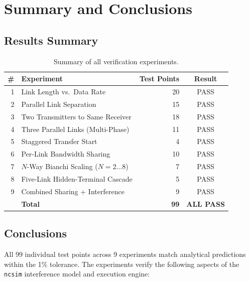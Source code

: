 \documentclass[11pt,a4paper]{article}
\newcommand{\ncsim}{\texttt{ncsim}}
\begin{document}
\section{Summary and Conclusions}
\label{sec:conclusions}

\subsection{Results Summary}

\begin{table}[h]
\centering
\caption{Summary of all verification experiments.}
\label{tab:summary}
\begin{tabular}{rlrc}
\toprule
\# & Experiment & Test Points & Result \\
\midrule
1 & Link Length vs.\ Data Rate & 20 & PASS \\
2 & Parallel Link Separation & 15 & PASS \\
3 & Two Transmitters to Same Receiver & 18 & PASS \\
4 & Three Parallel Links (Multi-Phase) & 11 & PASS \\
5 & Staggered Transfer Start & 4 & PASS \\
6 & Per-Link Bandwidth Sharing & 10 & PASS \\
7 & $N$-Way Bianchi Scaling ($N=2\ldots 8$) & 7 & PASS \\
8 & Five-Link Hidden-Terminal Cascade & 5 & PASS \\
9 & Combined Sharing + Interference & 9 & PASS \\
\midrule
& \textbf{Total} & \textbf{99} & \textbf{ALL PASS} \\
\bottomrule
\end{tabular}
\end{table}

\subsection{Conclusions}

All 99 individual test points across 9 experiments match analytical predictions within the 1\% tolerance. The experiments verify the following aspects of the \ncsim{} interference model and execution engine:
\end{document}
